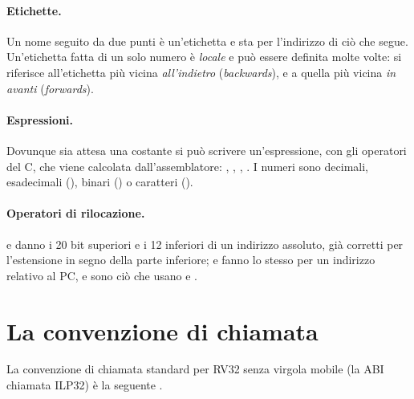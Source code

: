 \paragraph{Etichette.} Un nome seguito da due punti è un'etichetta e sta per
l'indirizzo di ciò che segue. Un'etichetta fatta di un solo numero è
\emph{locale} e può essere definita molte volte:  si riferisce
all'etichetta  più vicina \emph{all'indietro} (\emph{backwards}), e
 a quella più vicina \emph{in avanti} (\emph{forwards}).

\paragraph{Espressioni.} Dovunque sia attesa una costante si può scrivere
un'espressione, con gli operatori del C, che viene calcolata dall'assemblatore:
, , ,
. I numeri sono decimali, esadecimali (), binari
() o caratteri ().

\paragraph{Operatori di rilocazione.}  e 
danno i 20 bit superiori e i 12 inferiori di un indirizzo assoluto, già
corretti per l'estensione in segno della parte inferiore;
 e  fanno lo stesso per un
indirizzo relativo al PC, e sono ciò che usano  e .

\section{La convenzione di chiamata}

La convenzione di chiamata standard per RV32 senza virgola mobile (la ABI
chiamata ILP32) è la seguente \citep{riscvabi}.

